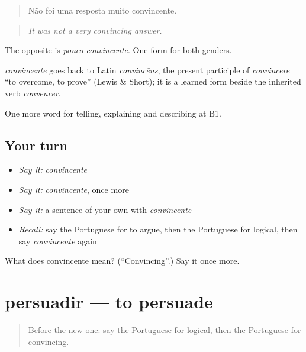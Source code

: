 \begin{quote}
Não foi uma resposta muito convincente.
\end{quote}

\begin{quote}
\emph{It was not a very convincing answer.}
\end{quote}

The opposite is \emph{pouco convincente}. One form for both genders.

\begin{cousinweb}
\emph{convincente} goes back to Latin \emph{convincēns}, the present participle of \emph{convincere} \textquotedblleft{}to overcome, to prove\textquotedblright{} (Lewis \& Short); it is a learned form beside the inherited verb \emph{convencer}.
\end{cousinweb}

\begin{grammarlens}[title={What you've built}]
One more word for telling, explaining and describing at B1.
\end{grammarlens}

\subsection*{Your turn}
\begin{itemize}
\raggedright
  \item \emph{Say it:} \emph{convincente}
  \item \emph{Say it:} \emph{convincente}, once more
  \item \emph{Say it:} a sentence of your own with \emph{convincente}
  \item \emph{Recall:} say the Portuguese for to argue, then the Portuguese for logical, then say \emph{convincente} again
\end{itemize}

\begin{tcolorbox}[breakable,colback=teal!4,colframe=teal!35!black,title={Before you move on}]
What does convincente mean? (\textquotedblleft{}Convincing\textquotedblright{}.) Say it once more.
\end{tcolorbox}
\section[persuadir]{persuadir — to persuade}

\label{lesson:PT-C337-persuadir}



\begin{quote}
Before the new one: say the Portuguese for logical, then the Portuguese for convincing.
\end{quote}

